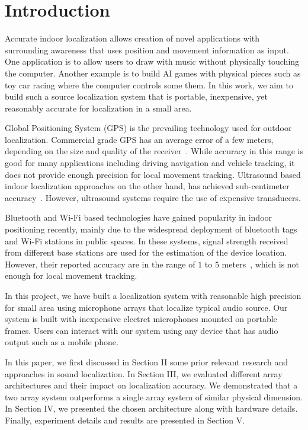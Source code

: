 \section{Introduction}


Accurate indoor localization allows creation of novel applications with surrounding awareness that uses position and movement information as input. One application is to allow users to draw with music without physically touching the computer. Another example is to build AI games with physical pieces such as toy car racing where the computer controls some them. In this work, we aim to build such a source localization system that is portable, inexpensive, yet reasonably accurate for localization in a small area. 

Global Positioning System (GPS) is the prevailing technology used for outdoor localization. Commercial grade GPS has an average error of a few meters, depending on the size and quality of the receiver~\cite{intro:gps}. While accuracy in this range is good for many applications including driving navigation and vehicle tracking, it does not provide enough precision for local movement tracking. Ultrasound based indoor localization approaches on the other hand, has achieved sub-centimeter accuracy~\cite{intro:ultra}. However, ultrasound systems require the use of expensive transducers.

Bluetooth and Wi-Fi based technologies have gained popularity in indoor positioning recently, mainly due to the widespread deployment of bluetooth tags and Wi-Fi stations in public spaces. In these systems, signal strength received from different base stations are used for the estimation of the device location. However, their reported accuracy are in the range of $1$ to $5$ meters~\cite{intro:blue, intro:loc}, which is not enough for local movement tracking.

In this project, we have built a localization system with reasonable high precision for small area using microphone arrays that localize typical audio source. Our system is built with inexpensive electret microphones mounted on portable frames. Users can interact with our system using any device that has audio output such as a mobile phone.

In this paper, we first discussed in Section II some prior relevant research and approaches in sound localization. In Section III, we evaluated different array architectures and their impact on localization accuracy. We demonstrated that a two array system outperforms a single array system of similar physical dimension. In Section IV, we presented the chosen architecture along with hardware details. Finally, experiment details and results are presented in Section V.
